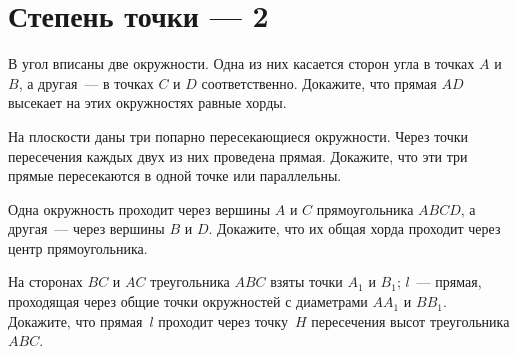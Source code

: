 
\section*{Степень точки --- 2}

\begin{problems}

\item
В угол вписаны две окружности.
Одна из них касается сторон угла в точках $A$ и $B$, а другая~---
в точках $C$ и $D$ соответственно.
Докажите, что прямая $AD$ высекает на этих окружностях равные хорды.

\item
На плоскости даны три попарно пересекающиеся окружности.
Через точки пересечения каждых двух из них проведена прямая.
Докажите, что эти три прямые пересекаются в одной точке или параллельны.

\item
Одна окружность проходит через вершины $A$ и $C$ прямоугольника $ABCD$,
а другая~--- через вершины $B$ и $D$.
Докажите, что их общая хорда проходит через центр прямоугольника.

\item
На сторонах $BC$ и $AC$ треугольника $ABC$ взяты точки $A_1$ и $B_1$;
$l$~--- прямая, проходящая через общие точки окружностей
с диаметрами $A A_1$ и $B B_1$.
Докажите, что прямая~$l$ проходит через точку~$H$ пересечения высот
треугольника $ABC$.

\end{problems}

